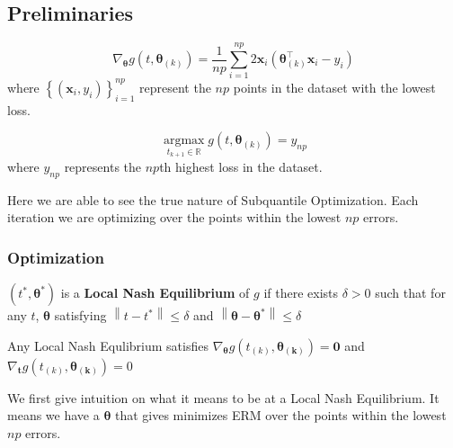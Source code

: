 \documentclass[
11pt, %
serif
]{beamer}
\newcommand{\norm}[1]{\left\lVert#1\right\rVert}
\begin{document}
	\subsection{Preliminaries}
	
	\begin{frame}
		\begin{lemma}
			\begin{equation*}
				\nabla_{\boldsymbol{\theta}} g(t,\boldsymbol{\theta}_{(k)}) = \frac{1}{np}\sum_{i=1}^{np}2\boldsymbol{x}_i\left(\boldsymbol{\theta}^\top_{(k)}\boldsymbol{x}_i - y_i\right)
			\end{equation*}
			where $\left\{(\boldsymbol{x}_i,y_i)\right\}_{i=1}^{np}$ represent the $np$ points in the dataset with the lowest loss.
		\end{lemma}
		\begin{lemma}
			\begin{equation*}
				\operatorname*{argmax}_{t_{k+1} \in \mathbb{R}}g(t,\boldsymbol{\theta}_{(k)}) = y_{np} 
			\end{equation*}
			where $y_{np}$ represents the $np$th highest loss in the dataset.
		\end{lemma}
		Here we are able to see the true nature of Subquantile Optimization. Each iteration we are optimizing over the points within the lowest $np$ errors.  
	\end{frame}
	
	\begin{frame}
		\frametitle{Optimization}
		\begin{definition}
			$(t^*, \boldsymbol{\theta}^*)$ is a \textbf{Local Nash Equilibrium} of $g$ if there exists $\delta > 0$ such that for any $t$, $\boldsymbol{\theta}$ satisfying $\norm{t - t^*}\leq \delta$ and $\norm{\boldsymbol{\theta} - \boldsymbol{\theta^*}} \leq \delta$
		\end{definition}
		\begin{lemma}
			Any Local Nash Equlibrium satisfies $\nabla_{\boldsymbol{\theta}}g(t_{(k)},\boldsymbol{\theta_{(k)}}) = \boldsymbol{0}$ and $\nabla_{\boldsymbol{t}}g(t_{(k)},\boldsymbol{\theta_{(k)}}) = 0$
		\end{lemma}
		We first give intuition on what it means to be at a Local Nash Equilibrium. It means we have a $\boldsymbol{\theta}$ that gives minimizes ERM over the points within the lowest $np$ errors. 
		
	\end{frame}
	
\end{document}
